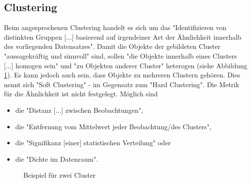 \subsection{Clustering}
Beim angesprochenen Clustering handelt es sich um das "Identifizieren von distinkten Gruppen [...] basierend auf irgendeiner Art der Ähnlichkeit innerhalb des vorliegenden Datensatzes"\citep[S.~195; eigene Übersetzung]{swamynathan_mastering_2017}. Damit die Objekte der gebildeten Cluster "aussagekräftig und sinnvoll" sind, sollen "die Objekte innerhalb eines Clusters [...] homogen sein" und "zu Objekten anderer Cluster"\citep[S.~337; eigene Übersetzung]{ramasubramanian_machine_2017} heterogen (siehe Abbildung \ref{fig:clustering}). Es kann jedoch auch sein, dass Objekte zu mehreren Clustern gehören. Dies nennt sich "Soft Clustering" - im Gegensatz zum "Hard Clustering"\citep[S.~339]{ramasubramanian_machine_2017}. Die Metrik für die Ähnlichkeit ist nicht festgelegt. Möglich sind 
\begin{itemize}
\item die "Distanz [...] zwischen Beobachtungen", 
\item die "Entfernung vom Mittelwert jeder Beobachtung/des Clusters",
\item die "Signifikanz [einer] statistischen Verteilung" oder
\item die "Dichte im Datenraum"\citep[S.~338; eigene Übersetzung]{ramasubramanian_machine_2017}.
\end{itemize}
\begin{figure}[H]
\centering
{}
\caption{Beispiel für zwei Cluster \citep[S.~9]{suthaharan_machine_2016}}
\label{fig:clustering}
\end{figure}

